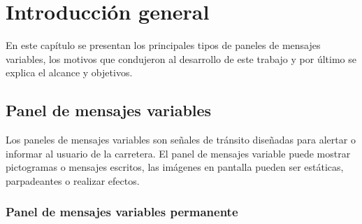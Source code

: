 
\chapter{Introducción general} %

\label{Chapter1} %
\label{IntroGeneral}
En este capítulo se presentan los principales tipos de paneles de mensajes variables, los motivos que condujeron al desarrollo de este trabajo y por último se explica el alcance y objetivos.

\newcommand{\keyword}[1]{\textbf{#1}}
\newcommand{\tabhead}[1]{\textbf{#1}}
\newcommand{\code}[1]{\texttt{#1}}
\newcommand{\file}[1]{\texttt{\bfseries#1}}
\newcommand{\option}[1]{\texttt{\itshape#1}}
\newcommand{\grados}{$^{\circ}$}



\section{Panel de mensajes variables}

Los paneles de mensajes variables son señales de tránsito diseñadas para alertar o informar al usuario de la carretera. El panel de mensajes variable puede mostrar pictogramas o mensajes escritos, las imágenes en pantalla pueden ser estáticas, parpadeantes o realizar efectos. %

\subsection{Panel de mensajes variables permanente}

